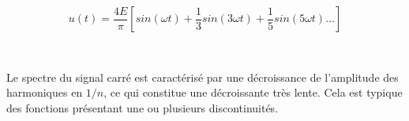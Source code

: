 \begin{minipage}{0.4\textwidth}
\begin{center}

\end{center}
\end{minipage}
\begin{minipage}{0.5\textwidth}
	$$ u(t) = \dfrac{4E}{\pi}\left[ sin(\omega t) + \dfrac{1}{3} sin ( 3\omega t ) + \dfrac{1}{5} sin( 5 \omega t ) \dots \right] $$
\end{minipage}\\

\bigskip

Le spectre du signal carré est caractérisé par une décroissance de l'amplitude des harmoniques en $1/n$, ce qui constitue une décroissante très lente. Cela est typique des fonctions présentant une ou plusieurs discontinuités. 

